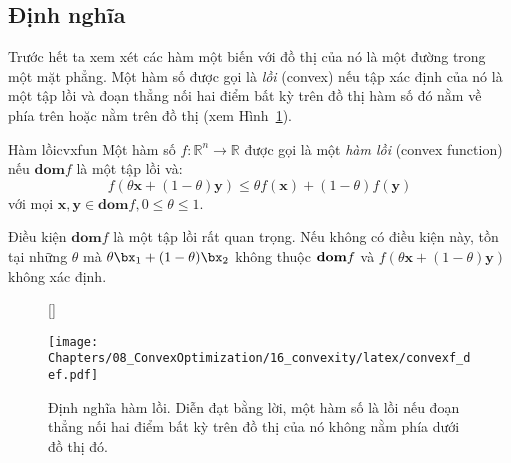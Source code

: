  
\subsection{Định nghĩa}
Trước hết ta xem xét các hàm một biến với đồ thị của nó là một đường trong một
mặt phẳng. Một hàm số được gọi là \textit{lồi} (convex) nếu {tập xác định của nó
là một tập lồi} và đoạn thẳng nối hai điểm bất kỳ trên đồ thị hàm số đó nằm về phía trên hoặc nằm trên đồ thị (xem
Hình~\ref{fig:16_convexf_def}). 
\begin{mydef}{Hàm lồi}{cvxfun}
    Một hàm số $f: \mathbb{R}^n \rightarrow \mathbb{R} $ được gọi là một \textit{hàm lồi} (convex function) nếu $\textbf{dom} f$ là một {tập lồi} và: 
\begin{equation*} 
f(\theta\mathbf{x} + (1 - \theta) \mathbf{y}) \leq \theta f(\mathbf{x}) + (1 - \theta)f(\mathbf{y}) 
\end{equation*} 
với mọi $\mathbf{x, y} \in \textbf{dom}f, 0 \leq \theta \leq 1$. 
\end{mydef}


Điều kiện $\textbf{dom} f$ là một {tập lồi} rất quan trọng. Nếu không
có điều kiện này, tồn tại những $\theta$ mà $\theta \bx_1 + (1-\theta)\bx_2$
không thuộc $\boldsymbol{\mathbf{dom}} f$ và $f(\theta\mathbf{x} + (1 -
\theta)
\mathbf{y}) $ không xác định.
 

\begin{figure}[t]
    [\FBwidth]
    {\caption{Định nghĩa hàm lồi. Diễn đạt bằng lời, một hàm số là lồi nếu đoạn thẳng nối hai điểm bất kỳ trên đồ thị của nó {không nằm phía dưới} đồ thị đó. }
    \label{fig:16_convexf_def}}
    {\texttt{[image: Chapters/08\_ConvexOptimization/16\_convexity/latex/convexf\_def.pdf]}}
\end{figure}


